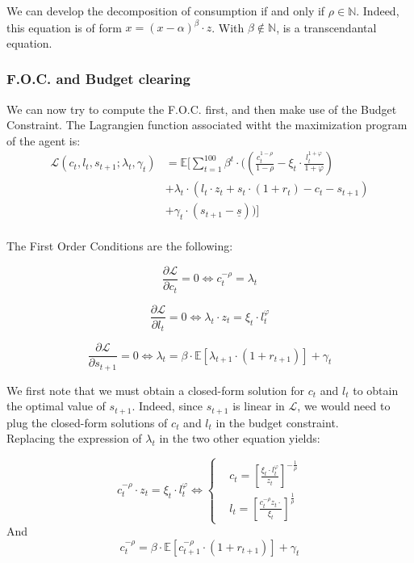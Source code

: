 \documentclass{article}
\begin{document}
We can develop the decomposition of consumption if and only if $\rho \in \mathbb{N}$.
Indeed, this equation is of form $x = (x-\alpha)^{\beta} \cdot z$.
With $\beta\notin \mathbb{N}$, is a transcendantal equation.

\subsubsection{F.O.C. and Budget clearing}

We can now try to compute the F.O.C. first, and then make use of the Budget Constraint.
The Lagrangien function associated witht the maximization program of the agent is: 
\begin{equation}
    \begin{split}
        \mathcal{L}(c_{t},l_{t},s_{t+1};\lambda_t,\gamma_{t}) &
        = \mathbb{E}\Big[\sum_{t=1}^{100} \beta^{t}\cdot ((\frac{c_{t}^{1-\rho}}{1-\rho}-\xi_{t}\cdot\frac{l_{t}^{1+\varphi}}{1+\varphi}) \\
        & +\lambda_{t}\cdot \left(l_{t}\cdot z_{t}+s_{t}\cdot (1+r_{t})-c_{t}-s_{t+1}\right) \\ 
        & + \gamma_{t}\cdot \left(s_{t+1}-\underline{s}\right))\Big] \\ 
    \end{split}
\end{equation}

The First Order Conditions are the following:

$$\frac{\partial \mathcal{L}}{\partial c_{t}} = 0 \iff c_{t}^{-\rho} = \lambda_{t}$$


$$\frac{\partial \mathcal{L}}{\partial l_{t}} = 0 \iff \lambda_{t}\cdot z_{t} = \xi_{t}\cdot l_{t}^{\varphi}$$


$$\frac{\partial \mathcal{L}}{\partial s_{t+1}} = 0 \iff \lambda_{t} = \beta \cdot \mathbb{E}\left[\lambda_{t+1}\cdot (1+r_{t+1})\right] + \gamma_{t}$$

We first note that we must obtain a closed-form solution for $c_{t}$ and $l_{t}$ to obtain 
the optimal value of $s_{t+1}$. 
Indeed, since $s_{t+1}$ is linear in $\mathcal{L}$, we would need to plug the closed-form
solutions of $c_{t}$ and $l_{t}$ in the budget constraint. \\

Replacing the expression of $\lambda_{t}$ in the two other equation yields: 

\begin{equation}
    c^{-\rho}_{t}\cdot z_{t} = \xi_{t}\cdot l_{t}^{\varphi} \iff
        \begin{cases}
        & c_t = \left[\frac{\xi_{t}\cdot l_{t}^{\varphi}}{z_{t}}\right]^{-\frac{1}{\rho}}\\ 
        & l_{t} = \left[\frac{c_{t}^{-\rho}z_{t}\cdot}{\xi_{t}}\right]^{\frac{1}{\rho}}
    \end{cases}
\end{equation}
And 
\begin{equation}
    c^{-\rho}_{t} = \beta \cdot \mathbb{E}\left[c^{-\rho}_{t+1}\cdot (1+r_{t+1})\right] + \gamma_{t}
\end{equation}
\end{document}
